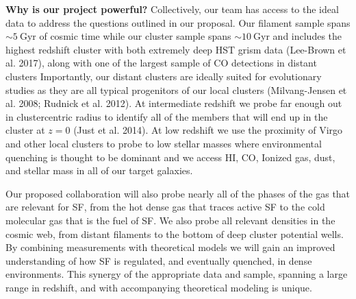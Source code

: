 \documentclass[11pt]{article}
\begin{document}

\textbf{Why is our project powerful?}   Collectively, our team has
access to the ideal data to address the questions outlined in our
proposal.  Our filament sample spans $\sim 5~$Gyr of cosmic time while our cluster sample spans $\sim10~$Gyr and
includes the highest redshift cluster with both extremely deep HST
grism data (Lee-Brown et al. 2017), along with one of the largest sample of CO detections in distant clusters \citep{Rudnick17b; Noble17}  Importantly, our distant clusters are ideally
suited for evolutionary studies as they are all typical progenitors of
our local clusters (Milvang-Jensen et al. 2008; Rudnick et al. 2012).
At intermediate redshift we probe far enough out in clustercentric
radius to identify all of the members that will end up in the cluster
at $z=0$ (Just et al. 2014).  At low redshift we use the proximity of Virgo and other local clusters to probe to low stellar masses where environmental quenching is thought to be dominant and we access HI, CO, Ionized gas, dust, and stellar mass in all of our target galaxies. 

Our proposed collaboration will also probe nearly all of the phases of
the gas that are relevant for SF, from the hot dense gas
that traces active SF to the cold molecular gas that is
the fuel of SF.  We also probe all relevant densities in the cosmic web, from distant filaments to the bottom of deep cluster potential wells.  By combining  measurements with
theoretical models we will gain an improved understanding of
how SF is regulated, and eventually quenched, in dense
environments.  This synergy of the appropriate data and sample, spanning a large range in redshift, and with
accompanying theoretical modeling is unique.
\end{document}
